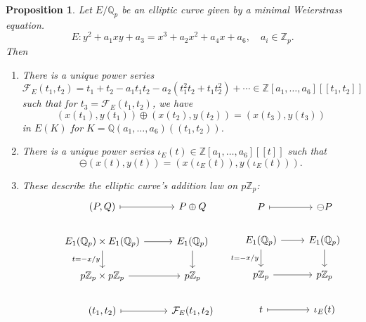 \documentclass[a4paper]{article}
\newtheorem{proposition}[theorem]{Proposition}
\theoremstyle{definition}
\newcommand{\series}[2]{#1[\![#2]\!]}
\newcommand{\lseries}[2]{#1(\!(#2)\!)}
\newcommand{\calF}{\mathcal{F}}
\newcommand{\Z}{\mathbb{Z}}
\newcommand{\Q}{\mathbb{Q}}
\begin{document}
\begin{proposition}
    Let $E/\Q_p$ be an elliptic curve given by a minimal Weierstrass equation.
    \begin{equation*}
        E:y^2+a_1xy+a_3=x^3+a_2x^2+a_4x+a_6,\quad a_i\in\Z_p.
    \end{equation*}
    Then
    \begin{enumerate}[label=(\roman*)]
        \item There is a unique power series
            \begin{equation*}
                \calF_E(t_1,t_2)
                    = t_1+t_2-a_1t_1t_2-a_2(t_1^2t_2+t_1t_2^2) + \cdots
                    \in \series{\Z[a_1,\ldots,a_6]}{t_1,t_2}
            \end{equation*}
            such that for $t_3=\calF_E(t_1,t_2)$, we have
            \begin{equation*}
                (x(t_1),y(t_1)) \oplus (x(t_2),y(t_2)) = (x(t_3),y(t_3))
            \end{equation*}
            in $E(K)$ for $K=\lseries{\Q(a_1,\ldots,a_6)}{t_1,t_2}$.

        \item There is a unique power series
            $\iota_E(t)\in\series{\Z[a_1,\ldots,a_6]}{t}$ such that
            \begin{equation*}
                \ominus(x(t),y(t)) = (x(\iota_E(t)),y(\iota_E(t))).
            \end{equation*}

        \item These describe the elliptic curve's addition law on $p\Z_p$:
            \begin{equation*}
                \begin{tikzcd}
                    &(P,Q) \ar[r,mapsto] &P\oplus Q \\
                    &E_1(\Q_p)\times E_1(\Q_p) \ar[d,"t=-x/y",swap] \ar[r]
                    &E_1(\Q_p) \ar[d] \\
                    &p\Z_p\times p\Z_p \ar[r]
                    &p\Z_p \\
                    &(t_1,t_2) \ar[r,mapsto] &\calF_E(t_1,t_2)
                \end{tikzcd}
                \begin{tikzcd}
                    &P \ar[r,mapsto] &\ominus P \\
                    &E_1(\Q_p) \ar[d,"t=-x/y",swap] \ar[r] &E_1(\Q_p) \ar[d] \\
                    &p\Z_p \ar[r] &p\Z_p \\
                    &t \ar[r,mapsto] &\iota_E(t)
                \end{tikzcd}
            \end{equation*}
    \end{enumerate}
\end{proposition}
\end{document}
